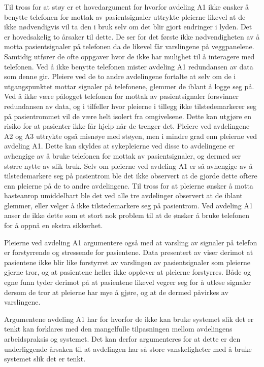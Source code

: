 \noindent 
Til tross for at støy er et hovedargument for hvorfor avdeling A1 ikke ønsker å benytte telefonen for mottak av pasientsignaler uttrykte pleierne likevel at de ikke nødvendigvis vil ta den i bruk selv om det blir gjort endringer i lyden. Det er hovedsakelig to årsaker til dette. De ser for det første ikke nødvendigheten av å motta pasientsignaler på telefonen da de likevel får varslingene på veggpanelene. Samtidig utfører de ofte oppgaver hvor de ikke har mulighet til å interagere med telefonen. Ved å ikke benytte telefonen mister avdeling A1 redundansen av data som denne gir.
Pleiere ved de to andre avdelingene fortalte at selv om de i utgangspunktet mottar signaler på telefonene, glemmer de iblant å logge seg på. Ved å ikke være pålogget telefonen for mottak av pasientsignaler forsvinner redundansen av data, og i tilfeller hvor pleierne i tillegg ikke tilstedemarkerer seg på pasientrommet vil de være helt isolert fra omgivelsene. Dette kan utgjøre en risiko for at pasienter ikke får hjelp når de trenger det. Pleiere ved avdelingene A2 og A3 uttrykte også misnøye med støyen, men i mindre grad enn pleierne ved avdeling A1. Dette kan skyldes at sykepleierne ved disse to avdelingene er avhengige av å bruke telefonen for mottak av pasientsignaler, og dermed ser større nytte av slik bruk. Selv om pleierne ved avdeling A1 er så avhengige av å tilstedemarkere seg på pasientrom ble det ikke observert at de gjorde dette oftere enn pleierne på de to andre avdelingene. Til tross for at pleierne ønsker å motta hasteanrop umiddelbart ble det ved alle tre avdelinger observert at de iblant glemmer, eller velger å ikke tilstedemarkere seg på pasientrom. Ved avdeling A1 anser de ikke dette som et stort nok problem til at de ønsker å bruke telefonen for å oppnå en ekstra sikkerhet. 

\noindent
Pleierne ved avdeling A1 argumentere også med at varsling av signaler på telefon er forstyrrende og stressende for pasientene. Data presentert av \citet{Rygh13} viser derimot at pasientene ikke blir like forstyrret av varslingen av pasientsignaler som pleierne gjerne tror, og at pasientene heller ikke opplever at pleierne forstyrres. Både \citet{Rygh13} og egne funn tyder derimot på at pasientene likevel vegrer seg for å utløse signaler dersom de tror at pleierne har mye å gjøre, og at de dermed påvirkes av varslingene.

\noindent
Argumentene avdeling A1 har for hvorfor de ikke kan bruke systemet slik det er tenkt kan forklares med den mangelfulle tilpasningen mellom avdelingens arbeidspraksis og systemet. Det kan derfor argumenteres for at dette er den underliggende årsaken til at avdelingen har så store vanskeligheter med å bruke systemet slik det er tenkt. 

